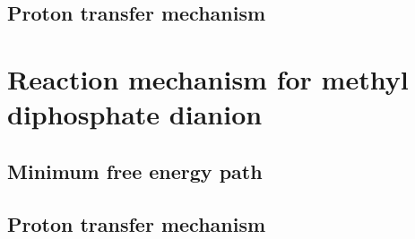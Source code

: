 

\subsection{Proton transfer mechanism}



\clearpage
\section{Reaction mechanism for methyl diphosphate dianion}



\subsection{Minimum free energy path}



\subsection{Proton transfer mechanism}



